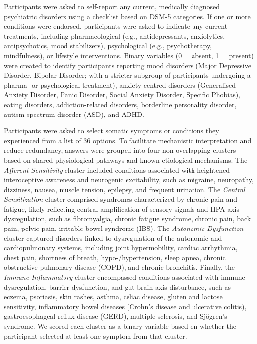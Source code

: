 \documentclass[
  jou,
  floatsintext,
  longtable,
  nolmodern,
  notxfonts,
  notimes,
  colorlinks=true,linkcolor=blue,citecolor=blue,urlcolor=blue]{apa7}
\begin{document}
Participants were asked to self-report any current, medically diagnosed
psychiatric disorders using a checklist based on DSM-5 categories. If
one or more conditions were endorsed, participants were asked to
indicate any current treatments, including pharmacological (e.g.,
antidepressants, anxiolytics, antipsychotics, mood stabilizers),
psychological (e.g., psychotherapy, mindfulness), or lifestyle
interventions. Binary variables (0 = absent, 1 = present) were created
to identify participants reporting mood disorders (Major Depressive
Disorder, Bipolar Disorder; with a stricter subgroup of participants
undergoing a pharma- or psychological treatment), anxiety-centred
disorders (Generalised Anxiety Disorder, Panic Disorder, Social Anxiety
Disorder, Specific Phobias), eating disorders, addiction-related
disorders, borderline personality disorder, autism spectrum disorder
(ASD), and ADHD.

Participants were asked to select somatic symptoms or conditions they
experienced from a list of 36 options. To facilitate mechanistic
interpretation and reduce redundancy, answers were grouped into four
non-overlapping clusters based on shared physiological pathways and
known etiological mechanisms. The \emph{Afferent Sensitivity} cluster
included conditions associated with heightened interoceptive awareness
and neurogenic excitability, such as migraine, neuropathy, dizziness,
nausea, muscle tension, epilepsy, and frequent urination. The
\emph{Central Sensitization} cluster comprised syndromes characterized
by chronic pain and fatigue, likely reflecting central amplification of
sensory signals and HPA-axis dysregulation, such as fibromyalgia,
chronic fatigue syndrome, chronic pain, back pain, pelvic pain,
irritable bowel syndrome (IBS). The \emph{Autonomic Dysfunction} cluster
captured disorders linked to dysregulation of the autonomic and
cardiopulmonary systems, including joint hypermobility, cardiac
arrhythmia, chest pain, shortness of breath, hypo-/hypertension, sleep
apnea, chronic obstructive pulmonary disease (COPD), and chronic
bronchitis. Finally, the \emph{Immune-Inflammatory} cluster encompassed
conditions associated with immune dysregulation, barrier dysfunction,
and gut-brain axis disturbance, such as eczema, psoriasis, skin rashes,
asthma, celiac disease, gluten and lactose sensitivity, inflammatory
bowel diseases (Crohn's disease and ulcerative colitis),
gastroesophageal reflux disease (GERD), multiple sclerosis, and
Sjögren's syndrome. We scored each cluster as a binary variable based on
whether the participant selected at least one symptom from that cluster.
\end{document}
